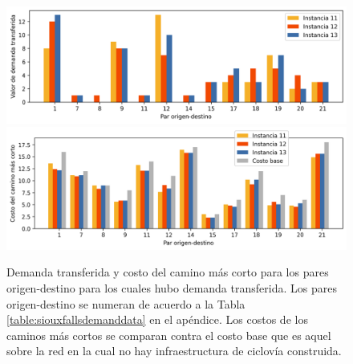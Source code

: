 \documentclass{article}
\begin{document}
  \begin{figure}[h!]
    \centering
    \includegraphics[width=12cm]{../resources/sensibility_case_study_demand.png}
    \includegraphics[width=12cm]{../resources/sensibility_case_study_shortest_paths.png}
    \caption{Demanda transferida y costo del camino más corto para los pares origen-destino para los cuales hubo demanda transferida. Los pares origen-destino se numeran de acuerdo a la Tabla \ref{table:siouxfallsdemanddata} en el apéndice. Los costos de los caminos más cortos se comparan contra el costo base que es aquel sobre la red en la cual no hay infraestructura de ciclovía construida.}
    \label{fig:sensibilitybyodpair_11_12_13}
  \end{figure}
\end{document}

